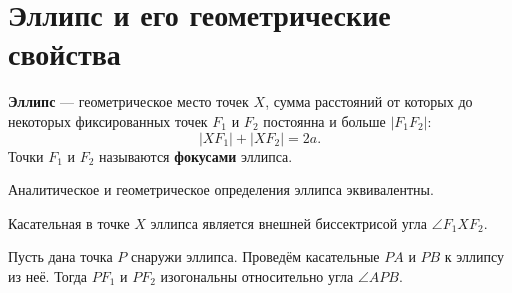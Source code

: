 \section{Эллипс и его геометрические свойства}

\begin{definition}
    \textbf{Эллипс} --- геометрическое место точек $X$, сумма расстояний от которых до некоторых фиксированных точек $F_1$ и $F_2$ постоянна и больше $|F_1F_2|$:
    $$
    |XF_1| + |XF_2| = 2a.
    $$
    Точки $F_1$ и $F_2$ называются \textbf{фокусами} эллипса.
\end{definition}

\begin{statement}
    Аналитическое и геометрическое определения эллипса эквивалентны.
\end{statement}

\begin{theorem}
    Касательная в точке $X$ эллипса является внешней биссектрисой угла $\angle F_1XF_2$.
\end{theorem}

\begin{theorem}
    Пусть дана точка $P$ снаружи эллипса. Проведём касательные $PA$ и $PB$ к эллипсу из неё. Тогда $PF_1$ и $PF_2$ изогональны относительно угла $\angle APB$.
\end{theorem}




